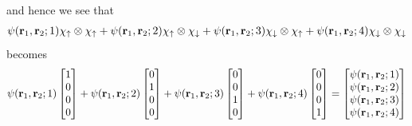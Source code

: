 \documentclass[12pt]{report}
\theoremstyle{custom}
\newcommand{\rb}{\bold{r}}
\begin{document}
and hence we see that
\begin{align*}
  \psi(\rb_1,\rb_2; 1) \chi_{\uparrow} \otimes \chi_{\uparrow} + \psi(\rb_1,\rb_2; 2) \chi_{\uparrow} \otimes \chi_{\downarrow} + \psi(\rb_1,\rb_2; 3) \chi_{\downarrow} \otimes \chi_{\uparrow} + \psi(\rb_1,\rb_2; 4) \chi_{\downarrow} \otimes \chi_{\downarrow} 
\end{align*}
becomes
\begin{equation*}
    \psi(\rb_1,\rb_2; 1)\begin{bmatrix}
    1 \\ 0 \\ 0 \\ 0
  \end{bmatrix}  + \psi(\rb_1,\rb_2; 2) \begin{bmatrix}
  0 \\ 1 \\ 0 \\ 0
\end{bmatrix}  + \psi(\rb_1,\rb_2; 3) \begin{bmatrix}
0 \\ 0 \\ 1 \\ 0
\end{bmatrix} + \psi(\rb_1,\rb_2; 4) \begin{bmatrix}
0 \\ 0 \\ 0 \\ 1\end{bmatrix}  = \begin{bmatrix}
  \psi(\rb_1,\rb_2; 1) \\
  \psi(\rb_1,\rb_2; 2) \\
  \psi(\rb_1,\rb_2; 3) \\
  \psi(\rb_1,\rb_2; 4)
\end{bmatrix}
\end{equation*}
\end{document}
